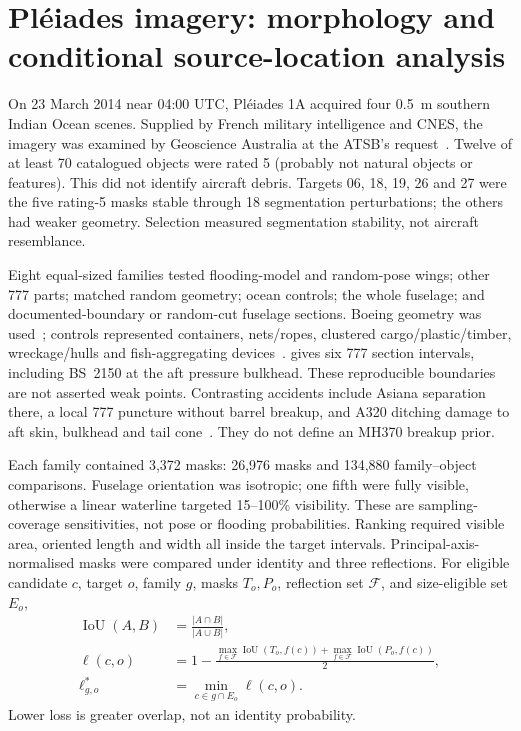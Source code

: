 \section{Pl\'eiades imagery: morphology and conditional source-location analysis}
\label{sec:pleiades-conditional}

On 23 March 2014 near 04:00 UTC, Pl\'eiades 1A acquired four 0.5~m
southern Indian Ocean scenes. Supplied by French military intelligence and
CNES, the imagery was examined by Geoscience Australia at the ATSB's
request~\citep{minchin2017pleiades}. Twelve of at least 70 catalogued objects
were rated 5 (probably not natural objects or features). This did not identify
aircraft debris. Targets 06, 18, 19, 26 and 27 were the five rating-5 masks
stable through 18 segmentation perturbations; the others had weaker geometry.
Selection measured segmentation stability, not aircraft resemblance.

Eight equal-sized families tested flooding-model and random-pose wings; other
777 parts; matched random geometry; ocean controls; the whole fuselage; and
documented-boundary or random-cut fuselage sections. Boeing geometry
was used~\citep{boeing2024acap}; controls represented containers, nets/ropes,
clustered cargo/plastic/timber, wreckage/hulls and fish-aggregating
devices~\citep{hapag2016container,iotc2023observer,lebreton2018plastic}.
\citet{murphy2013structures} gives six 777 section intervals, including BS~2150
at the aft pressure bulkhead. These reproducible boundaries are not asserted
weak points. Contrasting accidents include Asiana separation there, a local
777 puncture without barrel breakup, and A320 ditching damage to aft skin,
bulkhead and tail cone~\citep{aaib2010ba38,ntsb2010hudson,ntsb2014asiana}.
They do not define an MH370 breakup prior.

Each family contained 3,372 masks: 26,976 masks and 134,880 family--object
comparisons. Fuselage orientation was isotropic; one fifth were fully visible,
otherwise a linear waterline targeted 15--100\% visibility. These are
sampling-coverage sensitivities, not pose or flooding probabilities. Ranking
required visible area, oriented length and width all inside the target
intervals. Principal-axis-normalised masks were compared under identity and
three reflections. For eligible candidate $c$, target $o$, family $g$, masks
$T_o,P_o$, reflection set $\mathcal F$, and size-eligible set $E_o$,
\begin{equation}
\begin{aligned}
  \operatorname{IoU}(A,B)
    &=\frac{|A\cap B|}{|A\cup B|},\\
  \ell(c,o)
    &=1-\frac{
      \max_{f\in\mathcal F}\operatorname{IoU}(T_o,f(c))+
      \max_{f\in\mathcal F}\operatorname{IoU}(P_o,f(c))
    }{2},\\
  \ell^{*}_{g,o}
    &=\min_{c\in g\cap E_o}\ell(c,o).
\end{aligned}
\label{eq:pleiades-mask-loss}
\end{equation}
Lower loss is greater overlap, not an identity probability.

